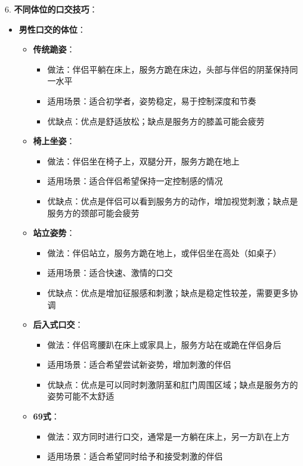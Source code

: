 \documentclass[12pt,UTF8]{ctexbook}
\begin{document}
6. \textbf{不同体位的口交技巧}：
  \begin{itemize}
  \item \textbf{男性口交的体位}：
    \begin{itemize}
    \item \textbf{传统跪姿}：
      \begin{itemize}
      \item 做法：伴侣平躺在床上，服务方跪在床边，头部与伴侣的阴茎保持同一水平
      \item 适用场景：适合初学者，姿势稳定，易于控制深度和节奏
      \item 优缺点：优点是舒适放松；缺点是服务方的膝盖可能会疲劳
      \end{itemize}
    \item \textbf{椅上坐姿}：
      \begin{itemize}
      \item 做法：伴侣坐在椅子上，双腿分开，服务方跪在地上
      \item 适用场景：适合伴侣希望保持一定控制感的情况
      \item 优缺点：优点是伴侣可以看到服务方的动作，增加视觉刺激；缺点是服务方的颈部可能会疲劳
      \end{itemize}
    \item \textbf{站立姿势}：
      \begin{itemize}
      \item 做法：伴侣站立，服务方跪在地上，或伴侣坐在高处（如桌子）
      \item 适用场景：适合快速、激情的口交
      \item 优缺点：优点是增加征服感和刺激；缺点是稳定性较差，需要更多协调
      \end{itemize}
    \item \textbf{后入式口交}：
      \begin{itemize}
      \item 做法：伴侣弯腰趴在床上或家具上，服务方站在或跪在伴侣身后
      \item 适用场景：适合希望尝试新姿势，增加刺激的伴侣
      \item 优缺点：优点是可以同时刺激阴茎和肛门周围区域；缺点是服务方的姿势可能不太舒适
      \end{itemize}
    \item \textbf{69式}：
      \begin{itemize}
      \item 做法：双方同时进行口交，通常是一方躺在床上，另一方趴在上方
      \item 适用场景：适合希望同时给予和接受刺激的伴侣

\end{itemize}
\end{itemize}
\end{itemize}
\end{document}
